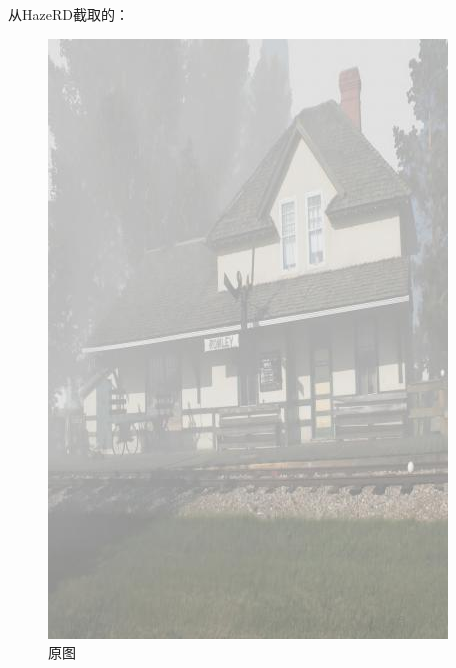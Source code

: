 \documentclass[12pt]{article}
\begin{document}
 从HazeRD截取的：\begin{figure}[!h]
    \centering
    \begin{minipage}[t]{0.24\linewidth}
        \centering
        \includegraphics[width=0.9\linewidth]{sample_pictures/HazeRD-example.jpg}
        \caption*{原图}
    \end{minipage}
    \begin{minipage}[t]{0.24\linewidth}
        \centering

\end{minipage}
\end{figure}
\end{document}
